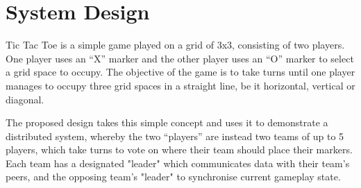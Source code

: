 \documentclass[conference]{IEEEtran}
\begin{document}
%


\section{System Design}
Tic Tac Toe is a simple game played on a grid of 3x3, consisting of two players. One player uses an “X” marker and the other player uses an “O” marker to select a grid space to occupy. The objective of the game is to take turns until one player manages to occupy three grid spaces in a straight line, be it horizontal, vertical or diagonal.

The proposed design takes this simple concept and uses it to demonstrate a distributed system, whereby the two “players” are instead two teams of up to 5 players, which take turns to vote on where their team should place their markers. Each team has a designated "leader" which communicates data with their team's peers, and the opposing team's "leader" to synchronise current gameplay state.
\end{document}
